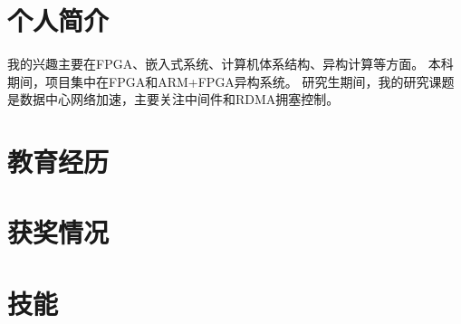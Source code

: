 \documentclass[11pt,a4paper]{moderncv}
\begin{document}
	
	\renewcommand{\refname}{Publication}
	\maketitle
	
	\section{个人简介}
	\cvline{}
	{
		我的兴趣主要在FPGA、嵌入式系统、计算机体系结构、异构计算等方面。
		\newline
		本科期间，项目集中在FPGA和ARM+FPGA异构系统。
		\newline
		研究生期间，我的研究课题是数据中心网络加速，主要关注中间件和RDMA拥塞控制。
	}
	\section{教育经历}
	\section{获奖情况}
	\section{技能}
	
\end{document}
